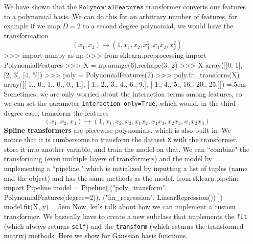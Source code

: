 \documentclass{article}
\theoremstyle{definition}
\newenvironment{cverbatim}
    {\SaveVerbatim{cverb}}
    {\endSaveVerbatim
    \flushleft\fboxrule=0pt\fboxsep=.5em
    \colorbox{cverbbg}{%
      \makebox[\dimexpr\linewidth-2\fboxsep][l]{\BUseVerbatim{cverb}}%
    }
    \endflushleft
  }
\begin{document}
    We have shown that the $\texttt{PolynomialFeatures}$ transformer converts our features to a polynomial basis. We can do this for an arbitrary number of features, for example if we map $D = 2$ to a second degree polynomial, we would have the transformation 
    \[(x_1, x_2) \mapsto (1, x_1, x_2, x_1^2, x_1 x_2, x_2^2)\]
    \begin{cverbatim}
    >>> import numpy as np
    >>> from sklearn.preprocessing import PolynomialFeatures
    >>> X = np.arange(6).reshape(3, 2)
    >>> X
    array([[0, 1],
           [2, 3],
           [4, 5]])
    >>> poly = PolynomialFeatures(2)
    >>> poly.fit_transform(X)
    array([[ 1.,  0.,  1.,  0.,  0.,  1.],
           [ 1.,  2.,  3.,  4.,  6.,  9.],
           [ 1.,  4.,  5., 16., 20., 25.]])
    \end{cverbatim}
    Sometimes, we are only worried about the interaction terms among features, so we can set the parameter \texttt{interaction\_only=True}, which would, in the third degree case, transform the features 
    \[(x_1, x_2, x_3) \mapsto (1, x_1, x_2, x_3, x_1 x_2, x_1 x_3, x_2 x_3, x_1 x_2 x_3)\]
    \textbf{Spline transformers} are piecewise polynomials, which is also built in. We notice that it is cumbersome to transform the dataset \texttt{X} with the transformer, store it into another variable, and train the model on that. We can ``combine" the transforming (even multiple layers of transformers) and the model by implementing a ``pipeline," which is initialized by inputting a list of tuples (name and the object) and has the same methods as the model. 
    \begin{cverbatim}
    from sklearn.pipeline import Pipeline
    model = Pipeline([("poly_transform", PolynomialFeatures(degree=2)), 
                      ("lin_regression", LinearRegression())
                      ]) 
    model.fit(X, y)
    \end{cverbatim}
    Now, let's talk about how we can implement a custom transformer. We basically have to create a new subclass that implements the \texttt{fit} (which always returns \texttt{self}) and the \texttt{transform} (which returns the transformed matrix) methods. Here we show for Gaussian basis functions. 
\end{document}
